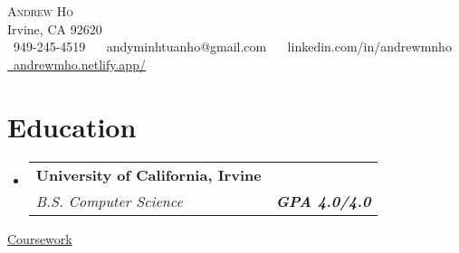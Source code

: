 \documentclass[letterpaper,11pt]{article}
\makeatletter
\newcommand{\resumeSubheading}[4]{
  \vspace{-2pt}\item
    \begin{tabular*}{1.0\textwidth}[t]{l@{\extracolsep{\fill}}r}
      \textbf{#1} & \textbf{\small #2} \\
      \textit{\small#3} & \textit{\small #4} \\
    \end{tabular*}\vspace{-7pt}
}
\newcommand{\resumeSubHeadingListStart}{\begin{itemize}[leftmargin=0.0in, label={}]}
\newcommand{\resumeSubHeadingListEnd}{\end{itemize}}
\makeatother
\begin{document}

\begin{center}
    {\Huge \scshape Andrew Ho} \\ \vspace{1pt}
    Irvine, CA 92620 \\ \vspace{1pt}
    \small \raisebox{-0.1\height}\faPhone\ 949-245-4519 ~ 
    \raisebox{-0.2\height}\faEnvelope\  {andyminhtuanho@gmail.com} ~
    \raisebox{-0.2\height}\faLinkedin\ {linkedin.com/in/andrewmnho}  ~
    \href{https://andrewmho.netlify.app//}{\raisebox{-0.2\height}\faGlobe\ \underline{andrewmho.netlify.app/}}
    \vspace{-8pt}
\end{center}


\section{Education}
\resumeSubHeadingListStart
\resumeSubheading
{University of California, Irvine \normalfont{\small{}}}
{\normalfont{June 2024}}
{B.S. Computer Science} {\textbf{GPA 4.0/4.0}}
\resumeSubHeadingListEnd
\underline{Coursework}{}
\vspace{-4pt}

\end{document}
